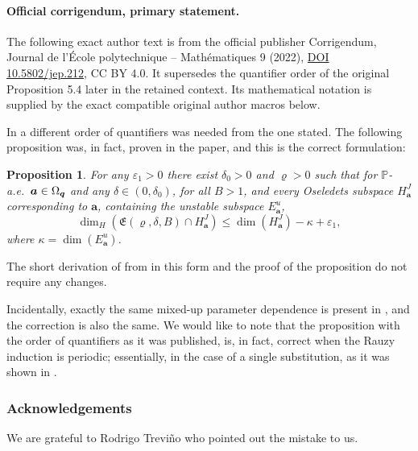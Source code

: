 \documentclass[11pt]{article}
\numberwithin{equation}{section}\newcommand{\Relation}[2][]{}\newtheorem*{prop*}{Proposition}
\let\epsilon\varepsilon
\theoremstyle{plain}
\theoremstyle{definition}
\newcommand\bom{{\boldsymbol a}}\let\ba\bom
\newcommand\bq{{\boldsymbol q}}
\let\Om\Omega
\newcommand\Fre{\mathfrak{E}}
\renewcommand{\P}{\mathbb{P}}
\begin{document}
\paragraph{Official corrigendum, primary statement.}
The following exact author text is from the official publisher Corrigendum, Journal de l'École polytechnique -- Mathématiques 9 (2022), \href{https://jep.centre-mersenne.org/articles/10.5802/jep.212/}{DOI 10.5802/jep.212}, CC BY 4.0. It supersedes the quantifier order of the original Proposition 5.4 later in the retained context. Its mathematical notation is supplied by the exact compatible original author macros below.

In \cite[Prop.\,5.4]{BuSo21} a different order of quantifiers was needed from the one stated. The following proposition was, in fact, proven in the paper, and this is the correct formulation:

\begin{prop*}
For any $\epsilon_1>0$ there exist $\delta_0>0$ and $\varrho>0$ such that for $\P$\nobreakdash-a.e.\ $\bom\in\nobreak \Om_\bq$ and any $\delta\in (0,\delta_0)$, for all $B>1$, and every
Oseledets subspace $H_\bom^J$ corresponding to $\bom$, containing the unstable subspace $E^u_\bom$,
\[
\dim_H(\Fre(\varrho,\delta,B)\cap H_\bom^J) \le \dim(H_\bom^J) -\kappa + \epsilon_1,
\]
where $\kappa=\dim(E^u_\bom)$.
\end{prop*}

The short derivation of \cite[Th.\,4.1]{BuSo21} from \cite[Prop.\,5.4]{BuSo21} in this form and the proof of the proposition do not require any changes. 

Incidentally, exactly the same mixed-up parameter dependence is present in \hbox{\cite[Prop.\,9.1]{BuSo18a}}, and the correction is also the same.
We would like to note that the proposition with the order of quantifiers as it was published, is, in fact, correct when the Rauzy induction is periodic; essentially, in the case of a single substitution, as it was shown in \cite{BuSol2}.

\subsubsection*{Acknowledgements}
We are grateful to Rodrigo Trevi\~no who pointed out the mistake to us.


\clearpage

\end{document}
